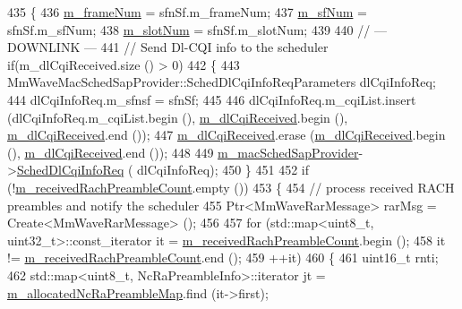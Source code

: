 \begin{DoxyCode}
435 \{
436         \hyperlink{classns3_1_1MmWaveEnbMac_a13df2d8bc521ce1f72b6b326b852c6d7}{m\_frameNum} = sfnSf.m\_frameNum;
437         \hyperlink{classns3_1_1MmWaveEnbMac_a04ec543b367c36d292077fa91168894b}{m\_sfNum} = sfnSf.m\_sfNum;
438         \hyperlink{classns3_1_1MmWaveEnbMac_a8c36f3e08fd6bb1908ff5b1b5c6917a9}{m\_slotNum} = sfnSf.m\_slotNum;
439 
440         \textcolor{comment}{// --- DOWNLINK ---}
441         \textcolor{comment}{// Send Dl-CQI info to the scheduler    if(m\_dlCqiReceived.size () > 0)}
442         \{
443                 MmWaveMacSchedSapProvider::SchedDlCqiInfoReqParameters dlCqiInfoReq;
444                 dlCqiInfoReq.m\_sfnsf = sfnSf;
445 
446                 dlCqiInfoReq.m\_cqiList.insert (dlCqiInfoReq.m\_cqiList.begin (), 
      \hyperlink{classns3_1_1MmWaveEnbMac_a051d16bd2a2abb3389efb160f680116d}{m\_dlCqiReceived}.begin (), \hyperlink{classns3_1_1MmWaveEnbMac_a051d16bd2a2abb3389efb160f680116d}{m\_dlCqiReceived}.end ());
447                 \hyperlink{classns3_1_1MmWaveEnbMac_a051d16bd2a2abb3389efb160f680116d}{m\_dlCqiReceived}.erase (\hyperlink{classns3_1_1MmWaveEnbMac_a051d16bd2a2abb3389efb160f680116d}{m\_dlCqiReceived}.begin (), 
      \hyperlink{classns3_1_1MmWaveEnbMac_a051d16bd2a2abb3389efb160f680116d}{m\_dlCqiReceived}.end ());
448 
449                 \hyperlink{classns3_1_1MmWaveEnbMac_a3df504a631404f94bee271abdca7bd88}{m\_macSchedSapProvider}->\hyperlink{classns3_1_1MmWaveMacSchedSapProvider_a20520fbb08538ce5b59d3ed99d3863d9}{SchedDlCqiInfoReq} (
      dlCqiInfoReq);
450         \}
451 
452         \textcolor{keywordflow}{if} (!\hyperlink{classns3_1_1MmWaveEnbMac_a2ef0d45938569968890f005676fcdf95}{m\_receivedRachPreambleCount}.empty ())
453         \{
454         \textcolor{comment}{// process received RACH preambles and notify the scheduler}
455                 Ptr<MmWaveRarMessage> rarMsg = Create<MmWaveRarMessage> ();
456 
457                 \textcolor{keywordflow}{for} (std::map<uint8\_t, uint32\_t>::const\_iterator it = 
      \hyperlink{classns3_1_1MmWaveEnbMac_a2ef0d45938569968890f005676fcdf95}{m\_receivedRachPreambleCount}.begin ();
458                                 it != \hyperlink{classns3_1_1MmWaveEnbMac_a2ef0d45938569968890f005676fcdf95}{m\_receivedRachPreambleCount}.end ();
459                                 ++it)
460                 \{
461                         uint16\_t rnti;
462                         std::map<uint8\_t, NcRaPreambleInfo>::iterator jt = 
      \hyperlink{classns3_1_1MmWaveEnbMac_a3138c3896ca19151f6a08008669e07da}{m\_allocatedNcRaPreambleMap}.find (it->first);

\end{DoxyCode}
